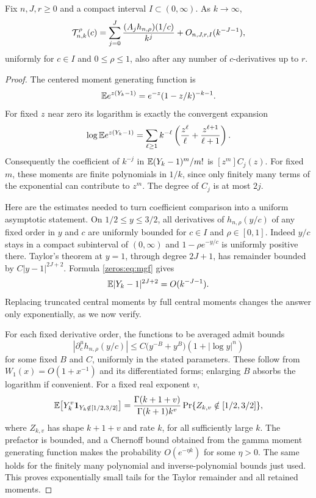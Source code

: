\begin{theorem}\label{zeros:thm:expansion}
Fix $n,J,r\geq0$ and a compact interval $I\subset(0,\infty)$. As $k\to\infty$,
\begin{equation}\label{zeros:eq:expansion}
 \mathcal T_{n,k}^{\rho}(c)
   =\sum_{j=0}^J\frac{(A_jh_{n,\rho})(1/c)}{k^j}
          +O_{n,J,r,I}(k^{-J-1}),
\end{equation}
uniformly for $c\in I$ and $0\leq\rho\leq1$, also after any number of $c$-derivatives up to $r$.
\end{theorem}
\begin{proof}
The centered moment generating function is
\[
 \mathbb E e^{z(Y_k-1)}=e^{-z}(1-z/k)^{-k-1}.
\]
For fixed $z$ near zero its logarithm is exactly the convergent expansion
\begin{equation}\label{zeros:eq:mgf}
 \log\mathbb E e^{z(Y_k-1)}
  =\sum_{\ell\geq1}k^{-\ell}
       \left(\frac{z^\ell}{\ell}+\frac{z^{\ell+1}}{\ell+1}\right).
\end{equation}
Consequently the coefficient of $k^{-j}$ in
$\mathbb E(Y_k-1)^m/m!$ is $[z^m]C_j(z)$. For fixed $m$, these moments are finite polynomials in $1/k$, since only finitely many terms of the exponential can contribute to $z^m$. The degree of $C_j$ is at most $2j$.

Here are the estimates needed to turn coefficient comparison into a uniform asymptotic statement. On $1/2\leq y\leq3/2$, all derivatives of $h_{n,\rho}(y/c)$ of any fixed order in $y$ and $c$ are uniformly bounded for $c\in I$ and $\rho\in[0,1]$. Indeed $y/c$ stays in a compact subinterval of $(0,\infty)$ and $1-\rho e^{-y/c}$ is uniformly positive there. Taylor's theorem at $y=1$, through degree $2J+1$, has remainder bounded by $C|y-1|^{2J+2}$. Formula \eqref{zeros:eq:mgf} gives
\[
 \mathbb E|Y_k-1|^{2J+2}=O(k^{-J-1}).
\]
Replacing truncated central moments by full central moments changes the answer only exponentially, as we now verify.

For each fixed derivative order, the functions to be averaged admit bounds
\[
 |\partial_c^u h_{n,\rho}(y/c)|
    \leq C\bigl(y^{-B}+y^B\bigr)(1+|\log y|^n)
\]
for some fixed $B$ and $C$, uniformly in the stated parameters. These follow from $W_1(x)=O(1+x^{-1})$ and its differentiated forms; enlarging $B$ absorbs the logarithm if convenient. For a fixed real exponent $v$,
\[
 \mathbb E\bigl[Y_k^v\mathbf1_{Y_k\notin[1/2,3/2]}\bigr]
 =\frac{\Gamma(k+1+v)}{\Gamma(k+1)k^v}
   \Pr\{Z_{k,v}\notin[1/2,3/2]\},
\]
where $Z_{k,v}$ has shape $k+1+v$ and rate $k$, for all sufficiently large $k$. The prefactor is bounded, and a Chernoff bound obtained from the gamma moment generating function makes the probability $O(e^{-\eta k})$ for some $\eta>0$. The same holds for the finitely many polynomial and inverse-polynomial bounds just used. This proves exponentially small tails for the Taylor remainder and all retained moments.


\end{proof}
